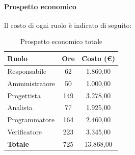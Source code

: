\documentclass[../PianoDiProgetto_v4.0.0.tex]{subfiles}
\begin{document}
			\newpage
			\paragraph{Prospetto economico}
			Il costo di ogni ruolo è indicato di seguito:
			\begin{table}[h]
				\centering
				\begin{tabular}{l * {2}{c}}
				\toprule
				\textbf{Ruolo} & \textbf{Ore} & \textbf{Costo (\euro{})} \\
				\midrule
				Responsabile & 62 & 1.860,00 \\
				Amministratore & 50 & 1.000,00 \\
				Progettista & 149 & 3.278,00 \\
				Analista & 77 & 1.925,00 \\		
				Programmatore & 164 & 2.460,00 \\		
				Verificatore & 223 & 3.345,00 \\				
				\midrule		
				\textbf{Totale} & 725 & 13.868,00 \\
				\bottomrule	
				\end{tabular}
				\caption{Prospetto economico totale}		
			\end{table}
			
\end{document}
